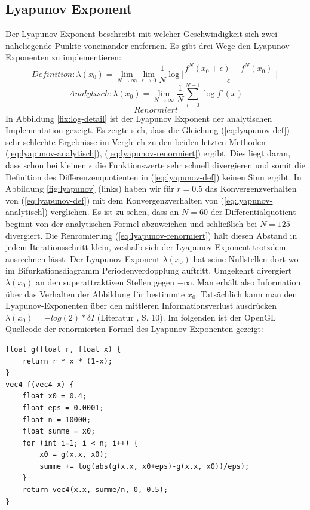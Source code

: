 \documentclass[12pt,a4paper]{article}
\begin{document}
\subsection{Lyapunov Exponent}
Der Lyapunov Exponent beschreibt mit welcher Geschwindigkeit sich zwei naheliegende Punkte voneinander entfernen. 
Es gibt drei Wege den Lyapunov Exponenten zu implementieren:
\begin{equation}
Definition: \lambda(x_0) = \lim_{N \rightarrow \infty}\lim_{\epsilon \rightarrow 0} \frac{1}{N}\log{\mid \frac{f^N(x_0+\epsilon)- f^N(x_0)}{\epsilon} \mid} 
\label{eq:lyapunov-def}
\end{equation}
\begin{equation}
Analytisch: \lambda(x_0) = \lim_{N \rightarrow \infty} \frac{1}{N} \sum_{i=0}^{N-1}  \log{f'(x)} 
\label{eq:lyapunov-analytisch}
\end{equation}
\begin{equation}
Renormiert
\label{eq:lyapunov-renormiert}
\end{equation}
In Abbildung \ref{fix:log-detail} ist der Lyapunov Exponent der analytischen Implementation gezeigt.
Es zeigte sich, dass die Gleichung (\ref{eq:lyapunov-def}) sehr schlechte Ergebnisse im Vergleich zu den beiden letzten Methoden (\ref{eq:lyapunov-analytisch}), (\ref{eq:lyapunov-renormiert}) ergibt.
Dies liegt daran, dass schon bei kleinen $\epsilon$ die Funktionswerte sehr schnell divergieren und somit die Definition des Differenzenquotienten in (\ref{eq:lyapunov-def}) keinen Sinn ergibt.
In Abbildung \ref{fig:lyapunov} (links) haben wir für $r=0.5$ das Konvergenzverhalten von (\ref{eq:lyapunov-def}) mit dem Konvergenzverhalten von (\ref{eq:lyapunov-analytisch}) verglichen. Es ist zu sehen, dass an $N=60$ der Differentialquotient beginnt von der analytischen Formel abzuweichen und schließlich bei $N=125$ divergiert.
Die Renromierung (\ref{eq:lyapunov-renormiert}) hält diesen Abstand in jedem Iterationsschritt klein, weshalb sich der Lyapunov Exponent trotzdem ausrechnen lässt.
Der Lyapunov Exponent $\lambda(x_0)$ hat seine Nullstellen dort wo im Bifurkationsdiagramm Periodenverdopplung auftritt. Umgekehrt divergiert $\lambda(x_0)$ an den superattraktiven Stellen gegen $-\infty$.
Man erhält also Information über das Verhalten der Abbildung für bestimmte $x_0$.
Tatsächlich kann man den Lyapunov-Exponenten über den mittleren Informationsverlust ausdrücken $\lambda(x_0)=-log(2)*\delta I$ (Literatur \parencite{versuchmappe}, S. 10).
Im folgenden ist der OpenGL Quellcode der renormierten Formel des Lyapunov Exponenten gezeigt:
\begin{lstlisting}
float g(float r, float x) {
    return r * x * (1-x);
}
vec4 f(vec4 x) {
    float x0 = 0.4;
    float eps = 0.0001;
    float n = 10000;
    float summe = x0;
    for (int i=1; i < n; i++) {
        x0 = g(x.x, x0);
        summe += log(abs(g(x.x, x0+eps)-g(x.x, x0))/eps);
    }
    return vec4(x.x, summe/n, 0, 0.5);
}
\end{lstlisting}
\end{document}

